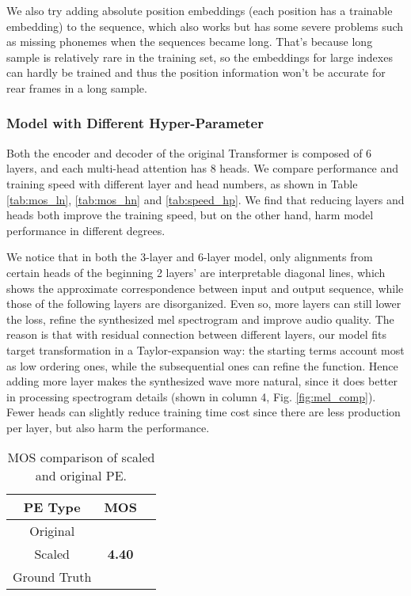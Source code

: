 \documentclass[letterpaper]{article} \usepackage{aaai19}  \usepackage{times}  \usepackage{helvet}  \usepackage{courier}  \usepackage{url}  \usepackage{graphicx}  \frenchspacing
\begin{document}
We also try adding absolute position embeddings (each position has a trainable embedding) to the sequence, which also works but has some severe problems such as missing phonemes when the sequences became long. That's because long sample is relatively rare in the training set, so the embeddings for large indexes can hardly be trained and thus the position information won't be accurate for rear frames in a long sample.

\subsubsection{Model with Different Hyper-Parameter}

Both the encoder and decoder of the original Transformer is composed of 6 layers, and each multi-head attention has 8 heads. We compare performance and training speed with different layer and head numbers, as shown in Table \ref{tab:mos_ln}, \ref{tab:mos_hn} and \ref{tab:speed_hp}. We find that reducing layers and heads both improve the training speed, but on the other hand, harm model performance in different degrees.

We notice that in both the 3-layer and 6-layer model, only alignments from certain heads of the beginning 2 layers' are interpretable diagonal lines, which shows the approximate correspondence between input and output sequence, while those of the following layers are disorganized. Even so, more layers can still lower the loss, refine the synthesized mel spectrogram and improve audio quality. The reason is that with residual connection between different layers, our model fits target transformation in a Taylor-expansion way: the starting terms account most as low ordering ones, while the subsequential ones can refine the function. Hence adding more layer makes the synthesized wave more natural, since it does better in processing spectrogram details (shown in column 4, Fig. \ref{fig:mel_comp}). Fewer heads can slightly reduce training time cost since there are less production per layer, but also harm the performance.

\begin{table}[t!]
  \centering
  \begin{tabular}{ccc}
    \toprule
    PE Type    &   MOS    \\
    \midrule
    Original            &                  \\
    Scaled     &   \textbf{4.40}            \\
    \midrule
    Ground Truth        &           \\
    \bottomrule
  \end{tabular}
  \caption{MOS comparison of scaled and original PE.}
  \label{tab:mos_scale_type}
\end{table}
\end{document}
